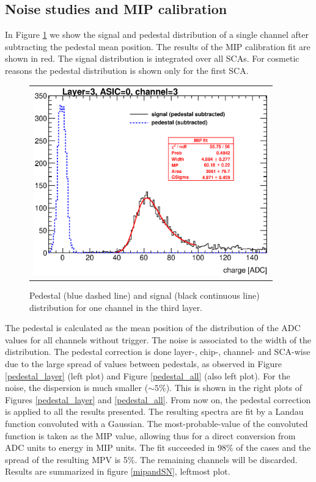 \documentclass[a4paper,11pt]{article}
\begin{document}
\subsection{Noise studies and MIP calibration}
\label{sec:calib}

In Figure \ref{signal_pedestal} we show the signal and pedestal distribution of a single channel after
subtracting the pedestal mean position. The results of the MIP calibration fit are shown in red.
The signal distribution is integrated over all SCAs.
For cosmetic reasons the pedestal distribution is shown only for the first SCA.


\begin{figure}[!ht]
  \centering
  \begin{tabular}{l}
    \includegraphics[width=4in]{../figs/mip_pedestal_example.eps}
  \end{tabular}
  \caption{Pedestal (blue dashed line) and signal (black continuous line) distribution for one channel in the third layer.}
\label{signal_pedestal}
\end{figure}

The pedestal is calculated as the mean position of
the distribution of the ADC values for all channels without trigger. The noise is
associated to the width of the distribution.
The pedestal correction is done layer-, chip-, channel- and SCA-wise due to the large spread of values between pedestals, as observed in 
Figure \ref{pedestal_layer} (left plot) and Figure \ref{pedestal_all} (also left plot).
For the noise, the dispersion is much smaller ($\sim 5 \%$). This is shown in the right plots of Figures \ref{pedestal_layer} and \ref{pedestal_all}.
From now on, the pedestal correction is applied to all the results presented.
The resulting spectra are fit by
a Landau function convoluted with a Gaussian.
The most-probable-value of the convoluted function is taken as the MIP value, allowing thus for a direct
conversion from ADC units to energy in MIP units.
The fit succeeded in 98\% of the cases and the spread of the resulting MPV is 5\%.
The remaining channels will be discarded. Results are summarized in figure \ref{mipandSN}, leftmost plot.
\end{document}
